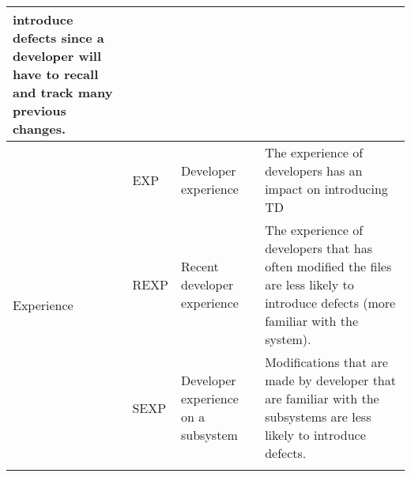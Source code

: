 \begin{table*}[!t]
\begin{tabular}{l|l|p{4.3cm}|p{9cm}}
introduce defects since a developer will have to recall and track many previous changes. \\\hline
\multirow{5}{*}{Experience} & EXP & Developer experience & The experience of developers has an impact on introducing TD \\\cline{2-4}
& REXP & Recent developer experience & The experience of developers that has often modified the files are less likely to introduce defects (more familiar with the system).  \\\cline{2-4}
& SEXP & Developer experience on a subsystem & Modifications that are made by developer that are familiar with the subsystems are less likely to introduce defects.  \\\cline{1-4}

\end{tabular}
\end{table*}